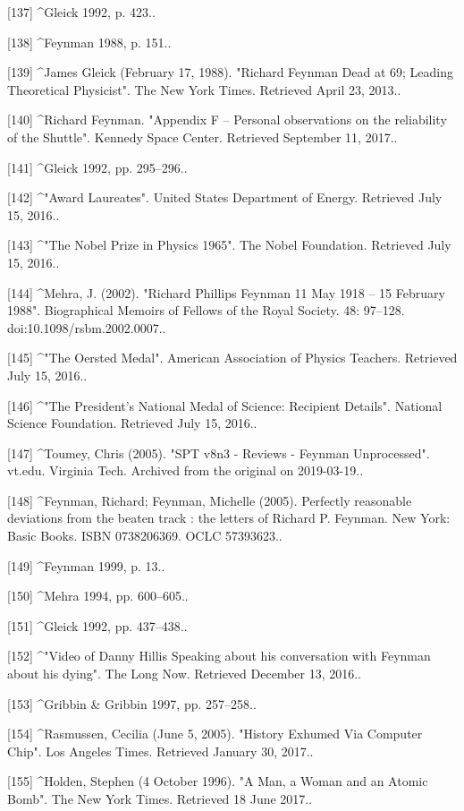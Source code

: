 [137]
^Gleick 1992, p. 423..

[138]
^Feynman 1988, p. 151..

[139]
^James Gleick (February 17, 1988). "Richard Feynman Dead at 69; Leading Theoretical Physicist". The New York Times. Retrieved April 23, 2013..

[140]
^Richard Feynman. "Appendix F – Personal observations on the reliability of the Shuttle". Kennedy Space Center. Retrieved September 11, 2017..

[141]
^Gleick 1992, pp. 295–296..

[142]
^"Award Laureates". United States Department of Energy. Retrieved July 15, 2016..

[143]
^"The Nobel Prize in Physics 1965". The Nobel Foundation. Retrieved July 15, 2016..

[144]
^Mehra, J. (2002). "Richard Phillips Feynman 11 May 1918 – 15 February 1988". Biographical Memoirs of Fellows of the Royal Society. 48: 97–128. doi:10.1098/rsbm.2002.0007..

[145]
^"The Oersted Medal". American Association of Physics Teachers. Retrieved July 15, 2016..

[146]
^"The President's National Medal of Science: Recipient Details". National Science Foundation. Retrieved July 15, 2016..

[147]
^Toumey, Chris (2005). "SPT v8n3 - Reviews - Feynman Unprocessed". vt.edu. Virginia Tech. Archived from the original on 2019-03-19..

[148]
^Feynman, Richard; Feynman, Michelle (2005). Perfectly reasonable deviations from the beaten track : the letters of Richard P. Feynman. New York: Basic Books. ISBN 0738206369. OCLC 57393623..

[149]
^Feynman 1999, p. 13..

[150]
^Mehra 1994, pp. 600–605..

[151]
^Gleick 1992, pp. 437–438..

[152]
^"Video of Danny Hillis Speaking about his conversation with Feynman about his dying". The Long Now. Retrieved December 13, 2016..

[153]
^Gribbin & Gribbin 1997, pp. 257–258..

[154]
^Rasmussen, Cecilia (June 5, 2005). "History Exhumed Via Computer Chip". Los Angeles Times. Retrieved January 30, 2017..

[155]
^Holden, Stephen (4 October 1996). "A Man, a Woman and an Atomic Bomb". The New York Times. Retrieved 18 June 2017..

